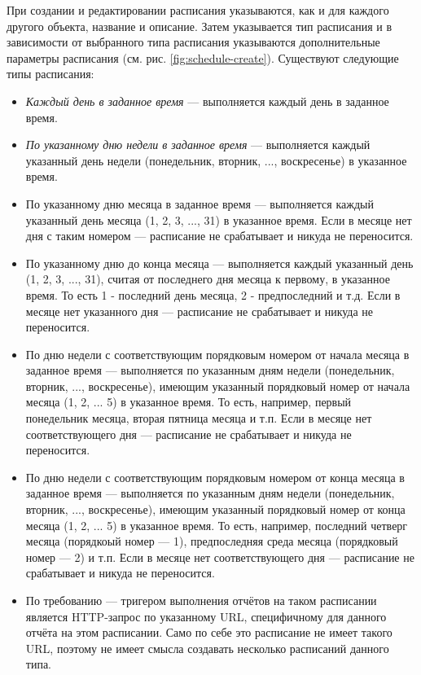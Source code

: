\documentclass[../user-manual.tex]{subfiles}
\begin{document}
	При создании и редактировании расписания указываются, как и для каждого другого объекта, название и описание. Затем указывается тип расписания и в зависимости от выбранного типа расписания указываются дополнительные параметры расписания (см. рис. \ref{fig:schedule-create}). Существуют следующие типы расписания:
	
	
	\begin{itemize}
		\item \textit{Каждый день в заданное время} --- выполняется каждый день в заданное время.
		
		\item \textit{По указанному дню недели в заданное время} --- выполняется каждый указанный день недели (понедельник, вторник, ..., воскресенье) в указанное время.
		
		\item По указанному дню месяца в заданное время --- выполняется каждый указанный день месяца (1, 2, 3, ..., 31) в указанное время. Если в месяце нет дня с таким номером --- расписание не срабатывает и никуда не переносится.
		
		\item По указанному дню до конца месяца --- выполняется каждый указанный день (1, 2, 3, ..., 31), считая от последнего дня месяца к первому, в указанное время. То есть 1 - последний день месяца, 2 - предпоследний и т.д. Если в месяце нет указанного дня --- расписание не срабатывает и никуда не переносится. 
		
		\item По дню недели с соответствующим порядковым номером от начала месяца в заданное время --- выполняется по указанным дням недели (понедельник, вторник, ..., воскресенье), имеющим указанный порядковый номер от начала месяца (1, 2, ... 5) в указанное время. То есть, например, первый понедельник месяца, вторая пятница месяца и т.п. Если в месяце нет соответствующего дня --- расписание не срабатывает и никуда не переносится.
		
		\item По дню недели с соответствующим порядковым номером от конца месяца в заданное время --- выполняется по указанным дням недели (понедельник, вторник, ..., воскресенье), имеющим указанный порядковый номер от конца месяца (1, 2, ... 5) в указанное время. То есть, например, последний четверг месяца (порядкоый номер --- 1), предпоследняя среда месяца (порядковый номер --- 2) и т.п. Если в месяце нет соответствующего дня --- расписание не срабатывает и никуда не переносится.
		
		\item По требованию --- тригером выполнения отчётов на таком расписании является HTTP-запрос по указанному URL, специфичному для данного отчёта на этом расписании. Само по себе это расписание не имеет такого URL, поэтому не имеет смысла создавать несколько расписаний данного типа.
		
	\end{itemize}
\end{document}
